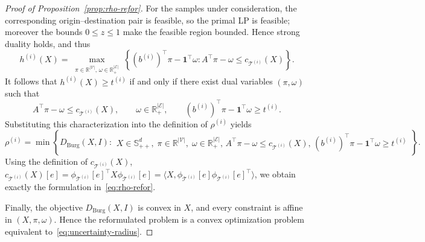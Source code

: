 \documentclass[11pt, letterpaper, oneside, reqno]{amsart}
\begin{document}
\begin{proof}[Proof of Proposition~\ref{prop:rho-refor}]
For the samples under consideration, the corresponding origin--destination pair is feasible, so the primal LP is feasible; moreover the bounds $0\le z\le 1$ make the feasible region bounded. Hence strong duality holds, and thus
\[
h^{(i)}(X)
= \max_{\substack{\pi\in\mathbb R^{|\mathcal V|},\, \omega\in\mathbb R_+^{|\mathcal E|}}}
\left\{(b^{(i)})^\top\pi - \mathbf 1^\top\omega : A^\top\pi-\omega\le c_{\mathcal T^{(i)}}(X) \right\}.
\]
It follows that
$h^{(i)}(X)\ge t^{(i)}$ 
if and only if there exist dual variables $(\pi,\omega)$ such that
\[
A^\top\pi-\omega\le c_{\mathcal T^{(i)}}(X),
\qquad
\omega\in\mathbb R_+^{|\mathcal E|},
\qquad
(b^{(i)})^\top\pi-\mathbf 1^\top\omega\ge t^{(i)}.
\]
Substituting this characterization into the definition of $\rho^{(i)}$ yields
\[
\rho^{(i)}
=
\min
\left\{
D_{\mathrm{Burg}}(X,I):
\begin{array}{l}
X\in\mathbb S_{++}^d,\;
\pi\in\mathbb R^{|\mathcal V|},\;
\omega\in\mathbb R_+^{|\mathcal E|},\,
A^\top\pi-\omega\le c_{\mathcal T^{(i)}}(X),\,
(b^{(i)})^\top\pi-\mathbf 1^\top\omega\ge t^{(i)}
\end{array}
\right\}.
\]
Using the definition of $c_{\mathcal T^{(i)}}(X)$,
$c_{\mathcal T^{(i)}}(X)[e]
= \phi_{\mathcal T^{(i)}}[e]^\top X\phi_{\mathcal T^{(i)}}[e]
= \langle X,\phi_{\mathcal T^{(i)}}[e]\phi_{\mathcal T^{(i)}}[e]^\top\rangle$,
we obtain exactly the formulation in~\eqref{eq:rho-refor}.

Finally, the objective $D_{\mathrm{Burg}}(X,I)$ is convex in $X$, and every constraint is affine in $(X,\pi,\omega)$. Hence the reformulated problem is a convex optimization problem equivalent to~\eqref{eq:uncertainty-radius}.
\end{proof}
\end{document}
